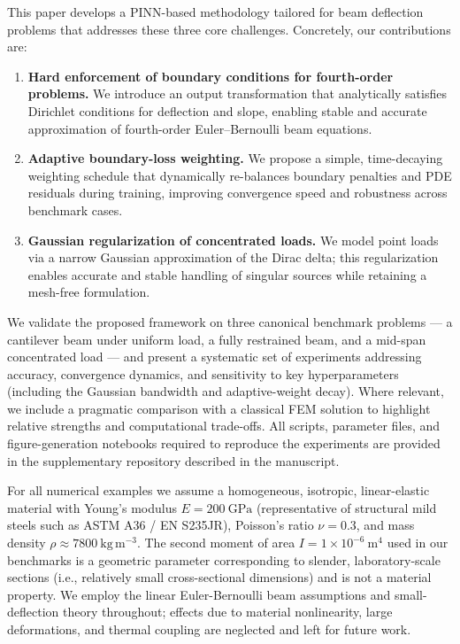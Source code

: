 \documentclass[twocolumn]{svjour3}
\begin{document}
	This paper develops a PINN-based methodology tailored for beam deflection problems that addresses these three core challenges. Concretely, our contributions are:
	\begin{enumerate}
	  \item \textbf{Hard enforcement of boundary conditions for fourth-order problems.} We introduce an output transformation that analytically satisfies Dirichlet conditions for deflection and slope, enabling stable and accurate approximation of fourth-order Euler--Bernoulli beam equations.
	  \item \textbf{Adaptive boundary-loss weighting.} We propose a simple, time-decaying weighting schedule that dynamically re-balances boundary penalties and PDE residuals during training, improving convergence speed and robustness across benchmark cases.
	  \item \textbf{Gaussian regularization of concentrated loads.} We model point loads via a narrow Gaussian approximation of the Dirac delta; this regularization enables accurate and stable handling of singular sources while retaining a mesh-free formulation.
	\end{enumerate}

	We validate the proposed framework on three canonical benchmark problems — a cantilever beam under uniform load, a fully restrained beam, and a mid-span concentrated load — and present a systematic set of experiments addressing accuracy, convergence dynamics, and sensitivity to key hyperparameters (including the Gaussian bandwidth and adaptive-weight decay). Where relevant, we include a pragmatic comparison with a classical FEM solution to highlight relative strengths and computational trade-offs. All scripts, parameter files, and figure-generation notebooks required to reproduce the experiments are provided in the supplementary repository described in the manuscript.\par\noindent For all numerical examples we assume a homogeneous, isotropic, linear-elastic material with Young's modulus \(E=200\ \mathrm{GPa}\) (representative of structural mild steels such as ASTM A36 / EN S235JR), Poisson's ratio \(\nu=0.3\), and mass density \(\rho\approx 7800\ \mathrm{kg\,m^{-3}}\). The second moment of area \(I=1\times10^{-6}\ \mathrm{m}^4\) used in our benchmarks is a geometric parameter corresponding to slender, laboratory-scale sections (i.e., relatively small cross-sectional dimensions) and is not a material property. We employ the linear Euler-Bernoulli beam assumptions and small-deflection theory throughout; effects due to material nonlinearity, large deformations, and thermal coupling are neglected and left for future work.
\end{document}
